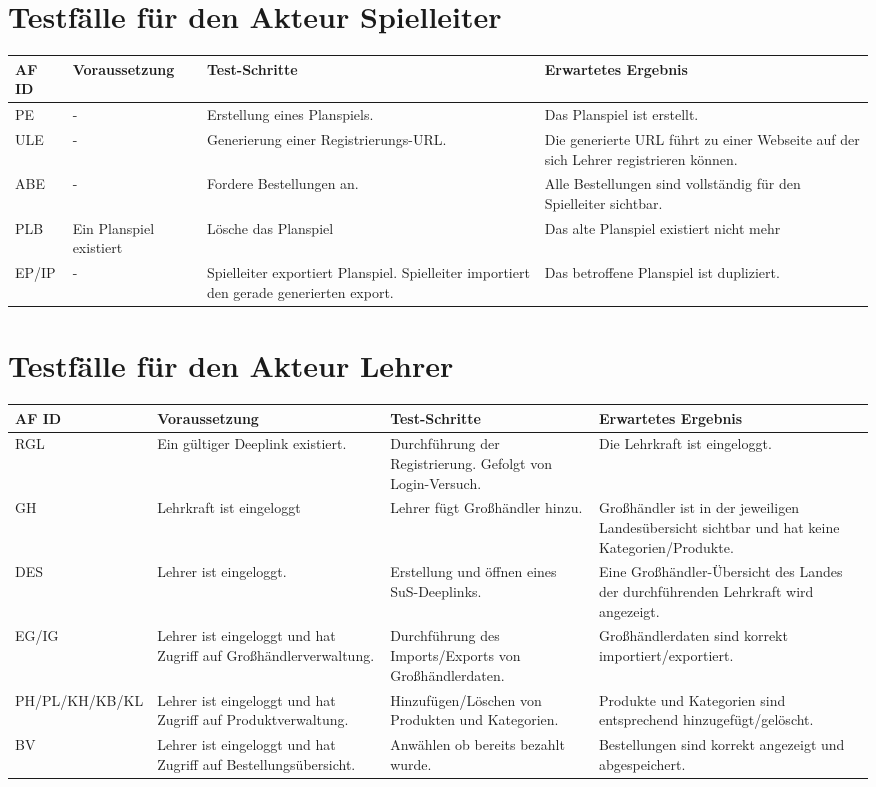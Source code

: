 \section{Testfälle für den Akteur Spielleiter}
\begin{tabularx}{\textwidth}{|l|X|X|X|}
	\hline
	\textbf{AF ID} & \textbf{Voraussetzung} & \textbf{Test-Schritte} & \textbf{Erwartetes Ergebnis} \\ \hline
	PE & - & Erstellung eines Planspiels. & Das Planspiel ist erstellt. \\ \hline
	ULE & - & Generierung einer Registrierungs-URL. & Die generierte URL führt zu einer Webseite auf der sich Lehrer registrieren können. \\ \hline
	ABE & - & Fordere Bestellungen an. & Alle Bestellungen sind vollständig für den Spielleiter sichtbar. \\ \hline
	PLB & Ein Planspiel existiert & Lösche das Planspiel & Das alte Planspiel existiert nicht mehr \\ \hline
	EP/IP & - & Spielleiter exportiert Planspiel. Spielleiter importiert den gerade generierten export. & Das betroffene Planspiel ist dupliziert. \\ \hline
\end{tabularx}

\newpage
\section{Testfälle für den Akteur Lehrer}
\begin{tabularx}{\textwidth}{|l|X|X|X|}
	\hline
	\textbf{AF ID} & \textbf{Voraussetzung} & \textbf{Test-Schritte} & \textbf{Erwartetes Ergebnis} \\ \hline
	RGL & Ein gültiger Deeplink existiert. & Durchführung der Registrierung. Gefolgt von Login-Versuch. & Die Lehrkraft ist eingeloggt. \\ \hline
	GH & Lehrkraft ist eingeloggt & Lehrer fügt Großhändler hinzu. & Großhändler ist in der jeweiligen Landesübersicht sichtbar und hat keine Kategorien/Produkte. \\ \hline
	DES & Lehrer ist eingeloggt. & Erstellung und öffnen eines SuS-Deeplinks. & Eine Großhändler-Übersicht des Landes der durchführenden Lehrkraft wird angezeigt. \\ \hline
	EG/IG & Lehrer ist eingeloggt und hat Zugriff auf Großhändlerverwaltung. & Durchführung des Imports/Exports von Großhändlerdaten. & Großhändlerdaten sind korrekt importiert/exportiert. \\ \hline
	PH/PL/KH/KB/KL & Lehrer ist eingeloggt und hat Zugriff auf Produktverwaltung. & Hinzufügen/Löschen von Produkten und Kategorien. & Produkte und Kategorien sind entsprechend hinzugefügt/gelöscht. \\ \hline
	BV & Lehrer ist eingeloggt und hat Zugriff auf Bestellungsübersicht. & Anwählen ob bereits bezahlt wurde. & Bestellungen sind korrekt angezeigt und abgespeichert. \\ \hline
\end{tabularx}

